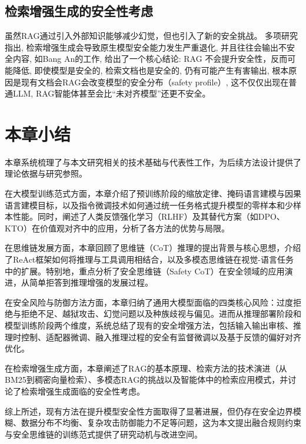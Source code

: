 \subsection{检索增强生成的安全性考虑}

虽然RAG通过引入外部知识能够减少幻觉，但也引入了新的安全挑战。
多项研究指出\supercite{Liang2025SafeRAG, Tan2024GluePizza}, 检索增强生成会导致原生模型安全能力发生严重退化\supercite{An2025RAGSafety}, 
并且往往会输出不安全内容, 如Bang An\supercite{An2025RAGSafety}的工作, 给出了一个核心结论:
RAG 不会提升安全性，反而可能降低, 即使模型是安全的, 检索文档也是安全的, 仍有可能产生有害输出, 根本原因是现有文档会RAG会改变模型的安全分布（safety profile）,
这不仅仅出现在普通LLM, RAG智能体\supercite{Yu2025SafetyDevolution}甚至会比“未对齐模型”还更不安全。

\section{本章小结}

本章系统梳理了与本文研究相关的技术基础与代表性工作，为后续方法设计提供了理论依据与研究参照。

在大模型训练范式方面，本章介绍了预训练阶段的缩放定律、掩码语言建模与因果语言建模目标，以及指令微调技术如何通过统一任务格式提升模型的零样本和少样本性能。同时，阐述了人类反馈强化学习（RLHF）及其替代方案（如DPO、KTO）在价值观对齐中的应用，分析了各方法的优势与局限。

在思维链发展方面，本章回顾了思维链（CoT）推理的提出背景与核心思想，介绍了ReAct框架如何将推理与工具调用相结合，以及多模态思维链在视觉-语言任务中的扩展。特别地，重点分析了安全思维链（Safety CoT）在安全领域的应用演进，从简单拒答到推理增强的发展过程。

在安全风险与防御方法方面，本章归纳了通用大模型面临的四类核心风险：过度拒绝与拒绝不足、越狱攻击、幻觉问题以及种族歧视与偏见。进而从推理部署阶段和模型训练阶段两个维度，系统总结了现有的安全增强方法，包括输入输出审核、推理时控制、适配器微调、融入推理过程的安全有监督微调以及基于反馈的偏好对齐优化。

在检索增强生成方面，本章阐述了RAG的基本原理、检索方法的技术演进（从BM25到稠密向量检索）、多模态RAG的挑战以及智能体中的检索应用模式，并讨论了检索增强生成面临的安全性考虑。

综上所述，现有方法在提升模型安全性方面取得了显著进展，但仍存在安全边界模糊、数据分布不均衡、复杂攻击防御能力不足等问题，这为本文提出融合规则约束与安全思维链的训练范式提供了研究动机与改进空间。
